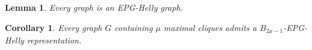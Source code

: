 \documentclass[9pt]{entcs}
\newtheorem{lema}{Lemma}[section]
\newtheorem{coro}{Corollary}[section]
\newtheorem{prove}{Proof}[section]
\begin{document}
 
 \begin{lema}\label{lem:todoGrafoEpgHelly}
 Every graph is an EPG-Helly graph.
 \end{lema}
  
  
  
 
 
%   
 
 
 \begin{coro}
 Every graph $G$ containing $\mu$ maximal cliques admits a $B_{2\mu -1}$-EPG-Helly representation. %
 \end{coro}
 
\end{document}

